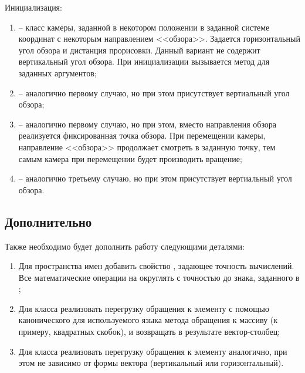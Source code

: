 	\noindent Инициализация:
	\begin{enumerate}
		\item {} -- класс камеры, заданной в некотором положении в заданной системе координат с некоторым направлением <<обзора>>. Задается горизонтальный угол обзора и дистанция прорисовки. Данный вариант не содержит вертикальный угол обзора. При инициализации вызывается метод  для заданных аргументов;
		\item {} -- аналогично первому случаю, но при этом присутствует вертиальный угол обзора;
		\item {} -- аналогично первому случаю, но при этом, вместо направления обзора реализуется фиксированная точка обзора. При перемещении камеры, направление <<обзора>> продолжает смотреть в заданную точку, тем самым камера при перемещении будет производить вращение;
		\item {} -- аналогично третьему случаю, но при этом присутствует вертиальный угол обзора.
	\end{enumerate}


\subsection{Дополнительно}

	Также необходимо будет дополнить работу следующими деталями:

	\begin{enumerate}
		\item Для пространства имен  добавить свойство , задающее точность вычислений. Все математические операции на  округлять с точностью до знака, заданного в ;
		\item Для класса  реализовать перегрузку обращения к элементу с помощью канонического для используемого языка метода обращения к массиву (к примеру, квадратных скобок), и возвращать в результате вектор-столбец;
		\item Для класса  реализовать перегрузку обращения к элементу аналогично, при этом не зависимо от формы вектора (вертикальный или горизонтальный).
	\end{enumerate}


